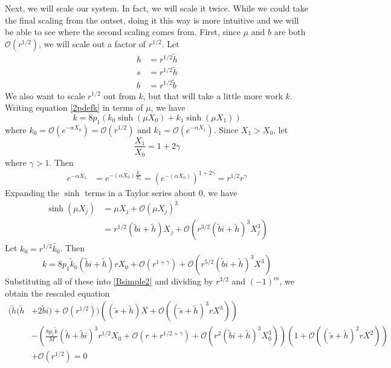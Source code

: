 \documentclass[thesis.tex]{subfiles}
\begin{document}
Next, we will scale our system. In fact, we will scale it twice. While we could take the final scaling from the outset, doing it this way is more intuitive and we will be able to see where the second scaling comes from. First, since $\mu$ and $b$ are both $\mathcal{O}(r^{1/2})$, we will scale out a factor of $r^{1/2}$. Let
\begin{align*}
h &= r^{1/2} \tilde{h} \\
s &= r^{1/2} \tilde{h} \\
b &= r^{1/2} \tilde{b}
\end{align*}
We also want to scale $r^{1/2}$ out from $k$, but that will take a little more work $k$. Writing equation \cref{2pdefk} in terms of $\mu$, we have
\[
k = 8 p_1 ( k_0\sinh(\mu X_0) + k_1 \sinh(\mu X_1) ) 
\]
where $k_0 = \mathcal{O}(e^{-\alpha X_0}) = \mathcal{O}(r^{1/2})$ and $k_1 = \mathcal{O}(e^{-\alpha X_1})$. Since $X_1 > X_0$, let 
\[
\frac{X_1}{X_0} = 1 + 2 \gamma
\]
where $\gamma > 1$. Then
\begin{align*}
e^{-\alpha X_1} &= e^{-(\alpha X_0)\frac{X_1}{X_0}}
= \left( e^{-(\alpha X_0)} \right)^{1 + 2 \gamma} = r^{1/2}r^{\gamma}
\end{align*}
Expanding the $\sinh$ terms in a Taylor series about 0, we have
\begin{align*}
\sinh(\mu X_j) &= \mu X_j + \mathcal{O}(\mu X_j)^3 \\
&= r^{1/2}(\tilde{b}i + \tilde{h})X_j + \mathcal{O}(r^{3/2} (\tilde{b}i + \tilde{h})^3 X_j^3)
\end{align*}
Let $k_0 = r^{1/2} \tilde{k_0}$. Then
\[
k = 8 p_1 \tilde{k}_0 (\tilde{b}i + \tilde{h})r X_0 +  \mathcal{O}(r^{1 + \gamma}) + \mathcal{O}(r^{5/2} (\tilde{b}i + \tilde{h})^3 X^3)
\]
Substituting all of these into \cref{Bsimple2} and dividing by $r^{3/2}$ and $(-1)^m$, we obtain the rescaled equation
\begin{equation}\label{Bsimple4}
\begin{aligned}
( \tilde{h}( \tilde{h} &+ 2 \tilde{b} i) + \mathcal{O}( r^{1/2} ))\left( (\tilde{s} + \tilde{h})X + \mathcal{O}\left( (\tilde{s} + \tilde{h})^3 r X^3 \right) \right) \\ 
&- \left(\frac{8 p_1 \tilde{k}}{M} ( \tilde{h} + \tilde{b}i)^3 r^{1/2} X_0 + \mathcal{O}(r + r^{1/2 + \gamma}) + \mathcal{O}(r^{2} (\tilde{b}i + \tilde{h})^3 X_0^3) \right)\left( 1 + \mathcal{O}\left( (\tilde{s} + \tilde{h})^2 r X^2 \right) \right) \\
&+ \mathcal{O}( r^{1/2} ) = 0
\end{aligned}
\end{equation} 
\end{document}
